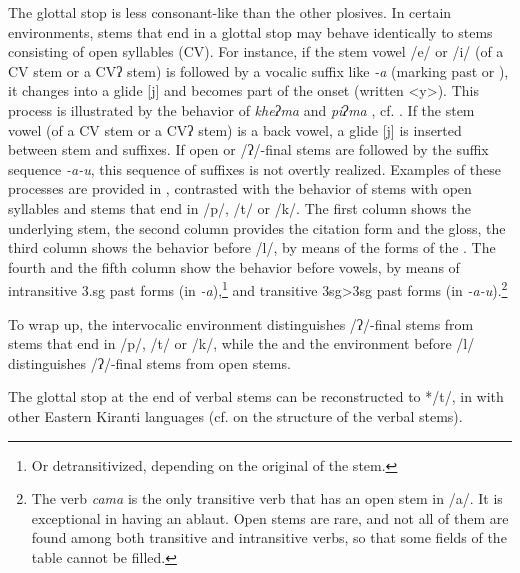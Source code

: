  
The glottal stop is less consonant-like than the other plosives. In certain environments, stems that end in a glottal stop may behave identically to  stems consisting of open syllables (CV). For instance, if the stem vowel /e/ or /i/ (of a CV stem or a CVʔ stem) is followed by a vocalic suffix like \emph{-a} (marking past or ), it changes into a glide [j] and becomes part of the onset (written <y>). This process is illustrated by the behavior of \emph{kheʔma}  and \emph{piʔma} , cf. . If the stem vowel (of a CV stem or a CVʔ stem) is a back vowel, a glide [j] is inserted between stem and suffixes. If open or /ʔ/-final stems are followed by the suffix sequence \emph{-a-u}, this sequence of suffixes is not overtly realized. Examples of these processes are provided in , contrasted with the behavior of stems with open syllables and stems that end in /p/, /t/ or /k/. The first column shows the underlying stem, the second column provides the citation form and the gloss, the third column shows the behavior before /l/, by means of the forms of the . The fourth and the fifth column show the behavior before vowels, by means of intransitive {\sc 3.sg} past forms (in \emph{-a}),\footnote{Or detransitivized, depending on the original  of the stem.} and transitive {\sc 3sg>3sg} past forms (in \emph{-a-u}).\footnote{The verb \emph{cama}  is the only transitive verb that has an open stem in /a/. It is exceptional in having an ablaut. Open stems are rare, and not all of them are found among both transitive and intransitive verbs, so that some fields of the table cannot be filled.}  

To wrap up, the intervocalic environment distinguishes /ʔ/-final stems from stems that end in /p/, /t/ or /k/, while the  and the environment before /l/ distinguishes /ʔ/-final stems from open stems. 

The glottal stop at the end of verbal stems can be reconstructed to */t/, in  with other Eastern Kiranti languages (cf.  on the structure of the verbal stems). 

